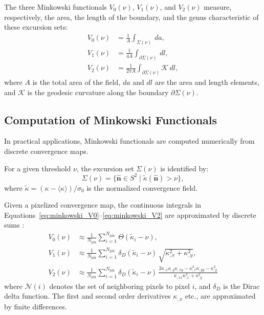 The three Minkowski functionals $V_0(\nu)$, $V_1(\nu)$, and $V_2(\nu)$ measure, respectively, the area, the length of the boundary, and the genus characteristic of these excursion sets:
\begin{align}
    V_0(\nu) &= \frac{1}{A} \int_{\Sigma(\nu)} \, da, \label{eq:minkowski_V0} \\
    V_1(\nu) &= \frac{1}{4A} \int_{\partial \Sigma(\nu)} \, dl, \label{eq:minkowski_V1} \\
    V_2(\nu) &= \frac{1}{2\pi A} \int_{\partial \Sigma(\nu)} \mathcal{K} \, dl, \label{eq:minkowski_V2}
\end{align}
where $A$ is the total area of the field, $da$ and $dl$ are the area and length elements, and $\mathcal{K}$ is the geodesic curvature along the boundary $\partial \Sigma(\nu)$. 

\subsection{Computation of Minkowski Functionals}
In practical applications, Minkowski functionals are computed numerically from discrete convergence maps.

For a given threshold $\nu$, the excursion set $\Sigma(\nu)$ is identified by:
\begin{equation}
    \Sigma(\nu) = \{ \hat{\mathbf{n}} \in S^2 \mid \tilde{\kappa}(\hat{\mathbf{n}}) > \nu \}, \label{eq:excursion_set_normalized}
\end{equation}
where $\tilde{\kappa} = (\kappa - \langle \kappa \rangle) / \sigma_0$ is the normalized convergence field.

Given a pixelized convergence map, the continuous integrals in Equations~\eqref{eq:minkowski_V0}--\eqref{eq:minkowski_V2} are approximated by discrete sums \citep{2012PhRvD..85j3513K}:
\begin{align}
    V_0(\nu) &\approx \frac{1}{N_{\mathrm{pix}}} \sum_{i=1}^{N_{\mathrm{pix}}} \Theta(\tilde{\kappa}_i - \nu), \label{eq:V0_discrete} \\
    V_1(\nu) &\approx \frac{1}{N_{\mathrm{pix}}} \sum_{i=1}^{N_{\mathrm{pix}}}  \delta_D(\tilde{\kappa}_i - \nu) \, \sqrt{\kappa_{, x}^2 + \kappa_{, y}^2}, \label{eq:V1_discrete} \\
    V_2(\nu) &\approx \frac{1}{N_{\mathrm{pix}}} \sum_{i=1}^{N_{\mathrm{pix}}}  \delta_D(\tilde{\kappa}_i - \nu) \, \frac{2\kappa_{, x}\kappa_{, y}\kappa_{, xy} - \kappa_{, x}^2 \kappa_{, yy} - \kappa_{, y}^2}{\kappa_{, xx}{\kappa_{, x}^2 + \kappa_{, y}^2}} \label{eq:V2_discrete}
\end{align}
where $\mathcal{N}(i)$ denotes the set of neighboring pixels to pixel $i$, and $\delta_D$ is the Dirac delta function. The first and second order derivatives $\kappa_{, x}$ etc., are approximated by finite differences.

